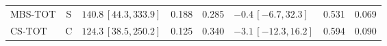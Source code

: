 \documentclass[10pt,a4paper]{article}
\begin{document}
\begin{longtable}{lcp{37mm}rrp{37mm}rr}
MBS-TOT & S & \(140.8\,[44.3,333.9]\) & 0.188 & 0.285 & \(-0.4\,[-6.7,32.3]\) & 0.531 & 0.069\\
CS-TOT & C & \(124.3\,[38.5,250.2]\) & 0.125 & 0.340 & \(-3.1\,[-12.3,16.2]\) & 0.594 & 0.090\\

\end{longtable}
\end{document}
